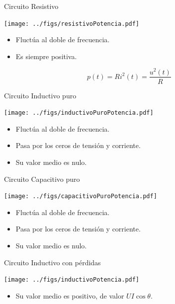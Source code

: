 \documentclass[xcolor={usenames,svgnames,dvipsnames}]{beamer}
\begin{document}
\begin{frame}[label={sec:orgcf4590e}]{Circuito Resistivo}
\begin{center}
\texttt{[image: ../figs/resistivoPotencia.pdf]}
\end{center}

\begin{itemize}
\item Fluctúa al doble de frecuencia.
\item Es siempre positiva.
\end{itemize}
\[
  p(t) = R i^2(t) = \frac{u^2(t)}{R}
\]
\end{frame}
\begin{frame}[label={sec:org9cdb8ad}]{Circuito Inductivo puro}
\begin{center}
\texttt{[image: ../figs/inductivoPuroPotencia.pdf]}
\end{center}

\begin{itemize}
\item Fluctúa al doble de frecuencia.
\item Pasa por los ceros de tensión y corriente.
\item Su valor medio es nulo.
\end{itemize}
\end{frame}


\begin{frame}[label={sec:org1002c53}]{Circuito Capacitivo puro}
\begin{center}
\texttt{[image: ../figs/capacitivoPuroPotencia.pdf]}
\end{center}

\begin{itemize}
\item Fluctúa al doble de frecuencia.
\item Pasa por los ceros de tensión y corriente.
\item Su valor medio es nulo.
\end{itemize}
\end{frame}

\begin{frame}[label={sec:org23fa41d}]{Circuito Inductivo con pérdidas}
\begin{center}
\texttt{[image: ../figs/inductivoPotencia.pdf]}
\end{center}

\begin{itemize}
\item Su valor medio es positivo, de valor \(U I \cos \theta\).
\end{itemize}
\end{frame}
\end{document}

